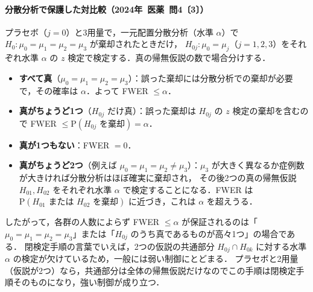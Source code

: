 \documentclass[a4paper,11pt,openany]{ltjsbook}
\newcommand{\kakomon}[2]{\mbox{#1年 医薬 問#2}}
\newcommand{\Prob}{\mathrm{P}}
\begin{document}
\paragraph{分散分析で保護した対比較（\kakomon{2024}{4}〔3〕）}
プラセボ（$j=0$）と3用量で，一元配置分散分析（水準 $\alpha$）で $H_0:\mu_0=\mu_1=\mu_2=\mu_3$ が棄却されたときだけ，
$H_{0j}:\mu_0=\mu_j$（$j=1,2,3$）をそれぞれ水準 $\alpha$ の $z$ 検定で検定する．真の帰無仮説の数で場合分けする．
\begin{itemize}
\item \textbf{すべて真}（$\mu_0=\mu_1=\mu_2=\mu_3$）：誤った棄却には分散分析での棄却が必要で，その確率は $\alpha$．よって FWER $\le\alpha$．
\item \textbf{真がちょうど1つ}（$H_{0j}$ だけ真）：誤った棄却は $H_{0j}$ の $z$ 検定の棄却を含むので FWER $\le\Prob(H_{0j}\text{ を棄却})=\alpha$．
\item \textbf{真が1つもない}：FWER $=0$．
\item \textbf{真がちょうど2つ}（例えば $\mu_0=\mu_1=\mu_2\ne\mu_3$）：$\mu_3$ が大きく異なるか症例数が大きければ分散分析はほぼ確実に棄却され，
      その後2つの真の帰無仮説 $H_{01},H_{02}$ をそれぞれ水準 $\alpha$ で検定することになる．FWER は $\Prob(H_{01}\text{ または }H_{02}\text{ を棄却})$ に近づき，これは $\alpha$ を超えうる．
\end{itemize}
したがって，各群の人数によらず FWER $\le\alpha$ が保証されるのは「$\mu_0=\mu_1=\mu_2=\mu_3$」または「$H_{0j}$ のうち真であるものが高々1つ」の場合である．
閉検定手順の言葉でいえば，2つの仮説の共通部分 $H_{0j}\cap H_{0k}$ に対する水準 $\alpha$ の検定が欠けているため，一般には弱い制御にとどまる．
プラセボと2用量（仮説が2つ）なら，共通部分は全体の帰無仮説だけなのでこの手順は閉検定手順そのものになり，強い制御が成り立つ．
\end{document}
